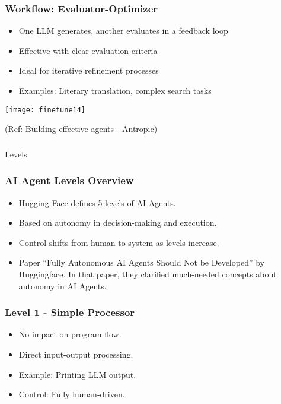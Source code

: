 \begin{frame}[fragile]\frametitle{Workflow: Evaluator-Optimizer}
    \begin{itemize}
        \item One LLM generates, another evaluates in a feedback loop
        \item Effective with clear evaluation criteria
        \item Ideal for iterative refinement processes
        \item Examples: Literary translation, complex search tasks
    \end{itemize}
	
	\begin{center}
	\texttt{[image: finetune14]}
	\end{center}

	{\tiny (Ref: Building effective agents - Antropic)}		
\end{frame}

\begin{frame}[fragile]\frametitle{}
\begin{center}
{\Large Levels}
\end{center}
\end{frame}

\begin{frame}[fragile]\frametitle{AI Agent Levels Overview}
      \begin{itemize}
      \item Hugging Face defines 5 levels of AI Agents.
      \item Based on autonomy in decision-making and execution.
      \item Control shifts from human to system as levels increase.
	  \item Paper ``Fully Autonomous AI Agents Should Not be Developed'' by Huggingface. In that paper, they clarified much-needed concepts about autonomy in AI Agents.
      \end{itemize}
\end{frame}

\begin{frame}[fragile]\frametitle{Level 1 - Simple Processor}
      \begin{itemize}
      \item No impact on program flow.
      \item Direct input-output processing.
      \item Example: Printing LLM output.
      \item Control: Fully human-driven.
      \end{itemize}
\end{frame}

